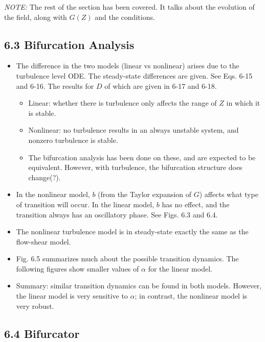 \documentclass[a4paper]{article}
\begin{document}
\emph{NOTE:} The rest of the section has been covered. It talks about
the evolution of the field, along with $G(Z)$ and the conditions.

\subsection{6.3 Bifurcation Analysis}\label{bifurcation-analysis-1}

\begin{itemize}
\item
  The difference in the two models (linear vs nonlinear) arises due to
  the turbulence level ODE. The steady-state differences are given. See
  Eqs. 6-15 and 6-16. The results for $D$ of which are given in 6-17 and
  6-18.

  \begin{itemize}
  \item
    Linear: whether there is turbulence only affects the range of $Z$ in
    which it is stable.
  \item
    Nonlinear: no turbulence results in an always unstable system, and
    nonzero turbulence is stable.
  \item
    The bifurcation analysis has been done on these, and are expected to
    be equivalent. However, with turbulence, the bifurcation structure
    does change(?).
  \end{itemize}
\item
  In the nonlinear model, $b$ (from the Taylor expansion of $G$) affects
  what type of transition will occur. In the linear model, $b$ has no
  effect, and the transition always has an oscillatory phase. See Figs.
  6.3 and 6.4.
\item
  The nonlinear turbulence model is in steady-state exactly the same as
  the flow-shear model.
\item
  Fig. 6.5 summarizes much about the possible transition dynamics. The
  following figures show smaller values of $\alpha$ for the linear
  model.
\item
  Summary: similar transition dynamics can be found in both models.
  However, the linear model is very sensitive to $\alpha$; in contrast,
  the nonlinear model is very robust.
\end{itemize}

\subsection{6.4 Bifurcator}\label{bifurcator}
\end{document}

